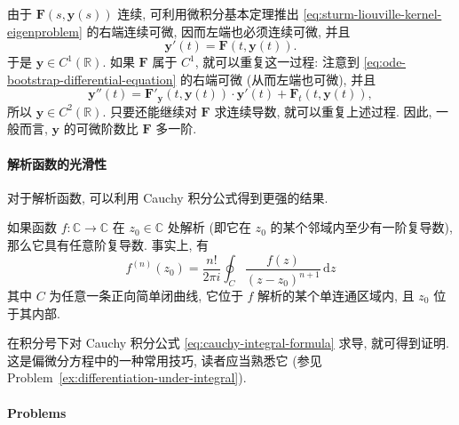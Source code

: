\begin{Proof}
由于 $\bm{F}(s,\bm{y}(s))$ 连续, 可利用微积分基本定理推出 \eqref{eq:sturm-liouville-kernel-eigenproblem} 的右端连续可微, 因而左端也必须连续可微, 并且
\begin{equation}\label{eq:ode-bootstrap-differential-equation}
\bm{y}'(t)=\bm{F}(t,\bm{y}(t)).
\end{equation}
于是 $\bm{y}\in C^1(\mathbb{R})$. 如果 $\bm{F}$ 属于 $C^1$, 就可以重复这一过程: 注意到 \eqref{eq:ode-bootstrap-differential-equation} 的右端可微 (从而左端也可微), 并且
\[
\bm{y}''(t)=\bm{F}'_{\bm{y}}(t,\bm{y}(t))\cdot\bm{y}'(t)+\bm{F}_t(t,\bm{y}(t)),
\]
所以 $\bm{y}\in C^2(\mathbb{R})$. 只要还能继续对 $\bm{F}$ 求连续导数, 就可以重复上述过程. 因此, 一般而言, $\bm{y}$ 的可微阶数比 $\bm{F}$ 多一阶.
\end{Proof}

\paragraph*{解析函数的光滑性}

对于解析函数, 可以利用 Cauchy 积分公式得到更强的结果.

\begin{Theorem}
\label{thm:analytic-infinite-differentiability}
如果函数 $f:\mathbb{C}\to\mathbb{C}$ 在 $z_0\in\mathbb{C}$ 处解析 (即它在 $z_0$ 的某个邻域内至少有一阶复导数), 那么它具有任意阶复导数. 事实上, 有
\begin{equation}\label{eq:cauchy-higher-derivatives}
f^{(n)}(z_0)=\dfrac{n!}{2\pi i}\oint_C\dfrac{f(z)}{(z-z_0)^{n+1}}\,\mathrm{d}z
\end{equation}
其中 $C$ 为任意一条正向简单闭曲线, 它位于 $f$ 解析的某个单连通区域内, 且 $z_0$ 位于其内部.
\end{Theorem}

在积分号下对 Cauchy 积分公式 \eqref{eq:cauchy-integral-formula} 求导, 就可得到证明. 这是偏微分方程中的一种常用技巧, 读者应当熟悉它 (参见 Problem~\ref{ex:differentiation-under-integral}).

\paragraph*{Problems}

